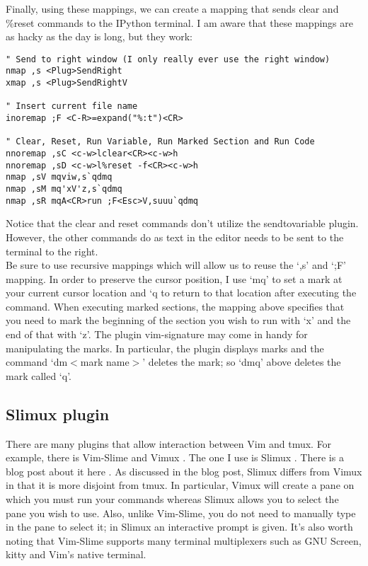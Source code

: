 \documentclass[10pt]{article}
\newcommand{\tlangle}{$<$}
\newcommand{\trangle}{$>$}
\begin{document}
Finally, using these mappings, we can create a mapping that sends clear and
\%reset commands to the IPython terminal. I am aware that these mappings are as
hacky as the day is long, but they work:
\begin{lstlisting}
" Send to right window (I only really ever use the right window)
nmap ,s <Plug>SendRight
xmap ,s <Plug>SendRightV

" Insert current file name
inoremap ;F <C-R>=expand("%:t")<CR>

" Clear, Reset, Run Variable, Run Marked Section and Run Code
nnoremap ,sC <c-w>lclear<CR><c-w>h
nnoremap ,sD <c-w>l%reset -f<CR><c-w>h
nmap ,sV mqviw,s`qdmq
nmap ,sM mq'xV'z,s`qdmq
nmap ,sR mqA<CR>run ;F<Esc>V,suuu`qdmq
\end{lstlisting}
Notice that the clear and reset commands don't utilize the sendtovariable
plugin. However, the other commands do as text in the editor needs to be sent to the terminal
to the right.\\

Be sure to use recursive mappings which will allow us to reuse the `,s' and `;F'
mapping. In order to preserve the cursor position, I use `mq' to set a mark at
your current cursor location and `q to return to that location after executing
the command. When executing marked sections, the mapping above specifies that you
need to mark the beginning of the section you wish to run with `x' and the end
of that with `z'. The plugin vim-signature \cite{kshenoy2015signature} may come
in handy for manipulating the marks. In particular, the plugin displays marks
and the command `dm\tlangle mark name\trangle' deletes the mark; so `dmq' above
deletes the mark called `q'.

\subsection{Slimux plugin}
There are many plugins that allow interaction between Vim and tmux. For example,
there is Vim-Slime \cite{jpalardy2012slime} and Vimux \cite{benmills2009vimux}.
The one I use is Slimux \cite{esamattis2015slimux}. There is a blog post about
it here \cite{suuronen2012slimux}. As discussed in the blog post, Slimux differs
from Vimux in that it is more disjoint from tmux. In particular, Vimux will
create a pane on which you must run your commands whereas Slimux allows you to
select the pane you wish to use. Also, unlike Vim-Slime, you do not need to
manually type in the pane to select it; in Slimux an interactive prompt is
given. It's also worth noting that Vim-Slime supports many terminal multiplexers
such as GNU Screen, kitty and Vim's native terminal.\\
\end{document}

